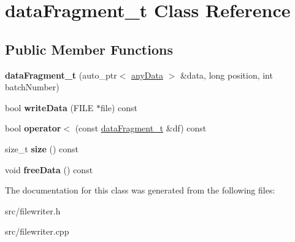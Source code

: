 \hypertarget{classdataFragment__t}{\section{data\-Fragment\-\_\-t \-Class \-Reference}
\label{classdataFragment__t}
}
\subsection*{\-Public \-Member \-Functions}
\begin{DoxyCompactItemize}
\item 
\hypertarget{classdataFragment__t_a5cc9b3a90c0a78dcc20171b71519ac12}{{\bfseries data\-Fragment\-\_\-t} (auto\-\_\-ptr$<$ \hyperlink{structanyData}{any\-Data} $>$ \&data, long position, int batch\-Number)}\label{classdataFragment__t_a5cc9b3a90c0a78dcc20171b71519ac12}

\item 
\hypertarget{classdataFragment__t_a87a39027078cc8368ae4dd01ea1ca354}{bool {\bfseries write\-Data} (\-F\-I\-L\-E $\ast$file) const }\label{classdataFragment__t_a87a39027078cc8368ae4dd01ea1ca354}

\item 
\hypertarget{classdataFragment__t_a59e489af41a9caafa92dae99893a319b}{bool {\bfseries operator$<$} (const \hyperlink{classdataFragment__t}{data\-Fragment\-\_\-t} \&df) const }\label{classdataFragment__t_a59e489af41a9caafa92dae99893a319b}

\item 
\hypertarget{classdataFragment__t_a40e1bd3b97463210a0deb251ca40ddc0}{size\-\_\-t {\bfseries size} () const }\label{classdataFragment__t_a40e1bd3b97463210a0deb251ca40ddc0}

\item 
\hypertarget{classdataFragment__t_aad12d1d57c403e5a3bca63adbc197580}{void {\bfseries free\-Data} () const }\label{classdataFragment__t_aad12d1d57c403e5a3bca63adbc197580}

\end{DoxyCompactItemize}


\-The documentation for this class was generated from the following files\-:\begin{DoxyCompactItemize}
\item 
src/filewriter.\-h\item 
src/filewriter.\-cpp\end{DoxyCompactItemize}
